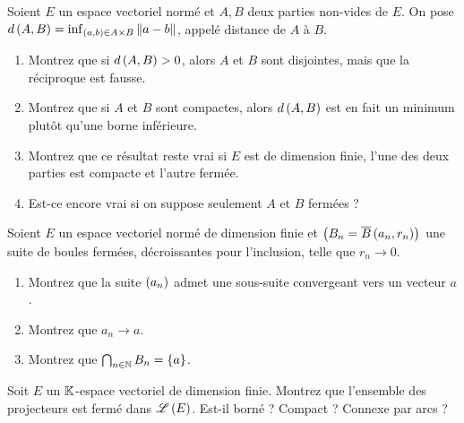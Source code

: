 \begin{exopss}[Exercice 24]
Soient \(E\) un espace vectoriel normé et \(A,B\) deux parties non-vides de \(E\). On pose \(d\paren{A,B}=\inf_{\paren{a,b}\in A\times B}\norme{a-b}\), appelé distance de \(A\) à \(B\).

\begin{enumerate}
    \item Montrez que si \(d\left(A,B\right)>0\), alors \(A\) et \(B\) sont disjointes, mais que la réciproque est fausse. \\
    \item Montrez que si \(A\) et \(B\) sont compactes, alors \(d\left(A,B\right)\) est en fait un minimum plutôt qu'une borne inférieure. \\
    \item Montrez que ce résultat reste vrai si \(E\) est de dimension finie, l'une des deux parties est compacte et l'autre fermée. \\
    \item Est-ce encore vrai si on suppose seulement \(A\) et \(B\) fermées ?
\end{enumerate}
\end{exopss}



\begin{exopss}[Exercice 25]
Soient \(E\) un espace vectoriel normé de dimension finie et \(\left(B_n=\overline{B}\left(a_n,r_n\right)\right)\) une suite de boules fermées, décroissantes pour l'inclusion, telle que \(r_n\to0\).

\begin{enumerate}
    \item Montrez que la suite \(\left(a_n\right)\) admet une sous-suite convergeant vers un vecteur \(a\). \\
    \item Montrez que \(a_n\to a\). \\
    \item Montrez que \(\bigcap_{n\in\mathbb{N}}B_n=\left\lbrace a\right\rbrace\).
\end{enumerate}
\end{exopss}



\begin{exoss}[Exercice 26]
Soit \(E\) un \(\mathbb{K}\)-espace vectoriel de dimension finie. Montrez que l'ensemble des projecteurs est fermé dans \(\mathscr{L}\left(E\right)\). Est-il borné ? Compact ? Connexe par arcs ?
\end{exoss}



